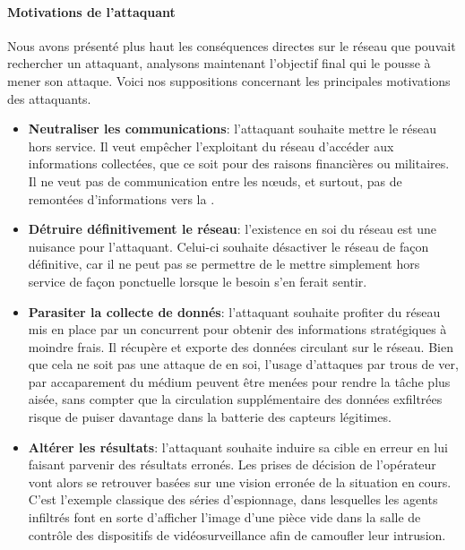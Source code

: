         \paragraph{Motivations de l'attaquant}
Nous avons présenté plus haut les conséquences directes sur le réseau que pouvait rechercher un attaquant, analysons maintenant l'objectif final qui le pousse à mener son attaque.
Voici nos suppositions concernant les principales motivations des attaquants.
\begin{itemize}
    \item \textbf{Neutraliser les communications}: l'attaquant souhaite mettre le réseau hors service. Il veut empêcher l'exploitant du réseau d'accéder aux informations collectées, que ce soit pour des raisons financières ou militaires. Il ne veut pas de communication entre les nœuds, et surtout, pas de remontées d'informations vers la \sdb.
    \item \textbf{Détruire définitivement le réseau}: l'existence en soi du réseau est une nuisance pour l'attaquant. Celui-ci souhaite désactiver le réseau de façon définitive, car il ne peut pas se permettre de le mettre simplement hors service de façon ponctuelle lorsque le besoin s'en ferait sentir.
    \item \textbf{Parasiter la collecte de donnés}: l'attaquant souhaite profiter du réseau mis en place par un concurrent pour obtenir des informations stratégiques à moindre frais. Il récupère et exporte des données circulant sur le réseau. Bien que cela ne soit pas une attaque de \dds en soi, l'usage d'attaques par trous de ver, par accaparement du médium peuvent être menées pour rendre la tâche plus aisée, sans compter que la circulation supplémentaire des données exfiltrées risque de puiser davantage dans la batterie des capteurs légitimes.
    \item \textbf{Altérer les résultats}: l'attaquant souhaite induire sa cible en erreur en lui faisant parvenir des résultats erronés. Les prises de décision de l'opérateur vont alors se retrouver basées sur une vision erronée de la situation en cours. C'est l'exemple classique des séries d'espionnage, dans lesquelles les agents infiltrés font en sorte d'afficher l'image d'une pièce vide dans la salle de contrôle des dispositifs de vidéosurveillance afin de camoufler leur intrusion.
\end{itemize}

